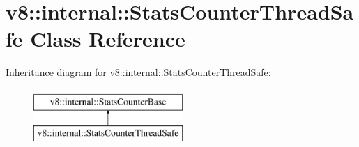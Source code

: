 \hypertarget{classv8_1_1internal_1_1StatsCounterThreadSafe}{}\section{v8\+:\+:internal\+:\+:Stats\+Counter\+Thread\+Safe Class Reference}
\label{classv8_1_1internal_1_1StatsCounterThreadSafe}
Inheritance diagram for v8\+:\+:internal\+:\+:Stats\+Counter\+Thread\+Safe\+:\begin{figure}[H]
\begin{center}
\leavevmode
\includegraphics[height=2.000000cm]{classv8_1_1internal_1_1StatsCounterThreadSafe}
\end{center}
\end{figure}
